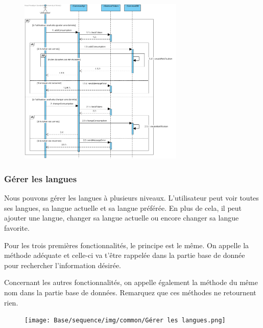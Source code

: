 \begin{figure}[h]
\centering
\includegraphics[width = 0.7\textwidth]{Base/sequence/img/common/Gérer les données.png}
\end{figure}

\newpage
\subsubsection{Gérer les langues}

\begin{flushleft}
Nous pouvons gérer les langues à plusieurs niveaux. L'utilisateur peut voir toutes ses langues, sa langue actuelle et sa langue préférée. En plus de cela, il peut ajouter une langue, changer sa langue actuelle ou encore changer sa langue favorite.
\end{flushleft}

\begin{flushleft}
Pour les trois premières fonctionnalités, le principe est le même. On appelle la méthode adéquate et celle-ci va t'être rappelée dans la partie base de donnée pour rechercher l'information désirée.
\end{flushleft}

\begin{flushleft}
Concernant les autres fonctionnalités, on appelle également la méthode du même nom dans la partie base de données. Remarquez que ces méthodes ne retournent rien.
\end{flushleft}

\begin{figure}[h]
\centering
\texttt{[image: Base/sequence/img/common/Gérer les langues.png]}
\end{figure}

